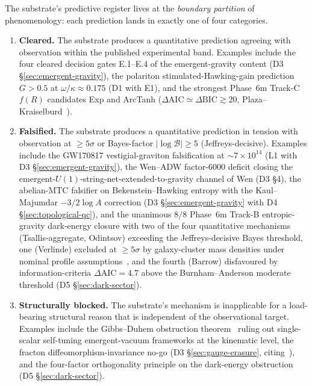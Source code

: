 \documentclass[aps,prd,reprint,nofootinbib,superscriptaddress]{revtex4-2}
\begin{document}
The substrate's predictive register lives at the \emph{boundary
partition} of phenomenology: each prediction lands in exactly one of
four categories.

\begin{enumerate}
\item \textbf{Cleared.} The substrate produces a quantitative
  prediction agreeing with observation within the published
  experimental band. Examples include the four cleared decision gates
  E.1--E.4 of the emergent-gravity content (D3 \S\ref{sec:emergent-gravity}),
  the polariton stimulated-Hawking-gain prediction $G > 0.5$ at
  $\omega/\kappa \approx 0.175$ (D1 with E1), and the strongest Phase~6m
  Track-C $f(R)$ candidates Exp and ArcTanh
  ($\Delta\!\mathrm{AIC} \simeq \Delta\!\mathrm{BIC} \gtrsim 20$,
  Plaza--Kraiselburd~\cite{Roehm2026D5}).
\item \textbf{Falsified.} The substrate produces a quantitative
  prediction in tension with observation at $\geq 5\sigma$ or
  Bayes-factor $|\log\mathcal{B}| \geq 5$ (Jeffreys-decisive). Examples
  include the GW170817 vestigial-graviton falsification at $\sim
  7\times 10^{14}$ (L1 with D3 \S\ref{sec:emergent-gravity}), the
  Wen--ADW factor-$6000$ deficit closing the
  emergent-$U(1)$-string-net-extended-to-gravity channel of Wen
  (D3 \S 4),
  the abelian-MTC falsifier on Bekenstein--Hawking entropy with the
  Kaul--Majumdar $-3/2\log A$ correction (D3 \S\ref{sec:emergent-gravity}
  with D4 \S\ref{sec:topological-qc}), and the unanimous $8/8$
  Phase~6m Track-B entropic-gravity dark-energy closure with two of
  the four quantitative mechanisms (Tsallis-aggregate,
  Odintsov) exceeding the Jeffreys-decisive Bayes threshold, one
  (Verlinde) excluded at $\geq 5\sigma$ by galaxy-cluster mass
  densities under nominal profile
  assumptions~\cite{HalenkaMiller2020}, and the
  fourth (Barrow) disfavoured by information-criteria
  $\Delta\!\mathrm{AIC} = 4.7$ above the Burnham--Anderson moderate
  threshold (D5 \S\ref{sec:dark-sector}).
\item \textbf{Structurally blocked.} The substrate's mechanism is
  inapplicable for a load-bearing structural reason that is independent
  of the observational target. Examples include the Gibbs--Duhem
  obstruction theorem~\cite{Roehm2026D5} ruling out single-scalar
  self-tuning emergent-vacuum frameworks at the kinematic level, the
  fracton diffeomorphism-invariance no-go (D3
  \S\ref{sec:gauge-erasure}, citing~\cite{PretkoRadzihovsky2018}),
  and the four-factor orthogonality principle on the dark-energy
  obstruction (D5 \S\ref{sec:dark-sector}).

\end{enumerate}
\end{document}
